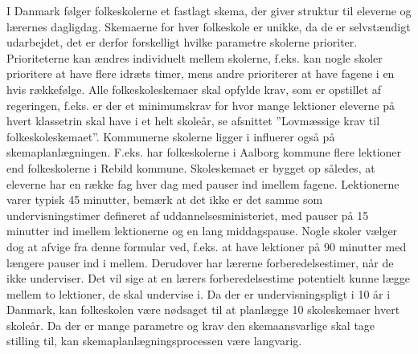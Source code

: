 I Danmark følger folkeskolerne et fastlagt skema, der giver struktur til eleverne og lærernes dagligdag. Skemaerne for hver folkeskole er unikke, da de er selvstændigt udarbejdet, det er derfor forskelligt hvilke parametre skolerne prioriter. Prioriteterne kan ændres individuelt mellem skolerne, f.eks. kan nogle skoler prioritere at have flere idræts timer, mens andre prioriterer at have fagene i en hvis rækkefølge. Alle folkeskoleskemaer skal opfylde krav, som er opstillet af regeringen, f.eks. er der et minimumskrav for hvor mange lektioner eleverne på hvert klassetrin skal have i et helt skoleår, se afsnittet ”Lovmæssige krav til folkeskoleskemaet”. Kommunerne skolerne ligger i influerer også på skemaplanlægningen. F.eks. har folkeskolerne i Aalborg kommune flere lektioner end folkeskolerne i Rebild kommune. Skoleskemaet er bygget op således, at eleverne har en række fag hver dag med pauser ind imellem fagene. Lektionerne varer typisk 45 minutter, bemærk at det ikke er det samme som undervisningstimer defineret af uddannelsesministeriet, med pauser på 15 minutter ind imellem lektionerne og en lang middagspause. Nogle skoler vælger dog at afvige fra denne formular ved, f.eks. at have lektioner på 90 minutter med længere pauser ind i mellem. Derudover har lærerne forberedelsestimer, når de ikke underviser. Det vil sige at en lærers forberedelsestime potentielt kunne lægge mellem to lektioner, de skal undervise i. Da der er undervisningspligt i 10 år i Danmark, kan folkeskolen være nødsaget til at planlægge 10 skoleskemaer hvert skoleår. Da der er mange parametre og krav den skemaansvarlige skal tage stilling til, kan skemaplanlægningsprocessen være langvarig.